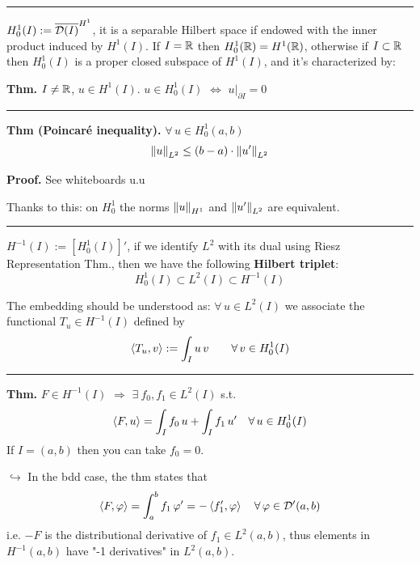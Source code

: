 \rule{0.31\textwidth}{0.2pt}
\smallskip

$H^1_0(I):=\overline{\mathcal{D}(I)}^{H^1}$, it is a separable Hilbert space if endowed with the inner product induced by $H^1(I)$. If $I=\mathbb{R}$ then $H^1_0(\mathbb{R})=H^1(\mathbb{R})$, otherwise if $I\subset\mathbb{R}$ then $H^1_0(I)$ is a proper closed subspace of $H^1(I)$, and it's characterized by:

\smallskip

\textbf{Thm.} $I\neq\mathbb{R}$, $u\in H^1(I)$. $u\in H^1_0(I)$ $\Leftrightarrow$ $u\big|_{\partial I}=0$

\rule{0.31\textwidth}{0.2pt}
\smallskip

\textbf{Thm (Poincaré inequality).} $\forall\, u\in H^1_0(a,b)$
\begin{equation*}
\left\lVert u \right\rVert_{L^2}\leq (b-a)\cdot \left\lVert u' \right\rVert_{L^2}
\end{equation*}

\textbf{\color{lavender(floral)}Proof.} See whiteboards u.u

\smallskip

Thanks to this: on $H^1_0$ the norms $\left\lVert u \right\rVert_{H^1}$ and $\left\lVert u' \right\rVert_{L^2}$ are equivalent.

\rule{0.31\textwidth}{0.2pt}
\smallskip

$H^{-1}(I):=\left[ H^1_0(I) \right]'$, if we identify $L^2$ with its dual using Riesz Representation Thm., then we have the following \textbf{Hilbert triplet}:
\begin{equation*}
H_0^1(I)\subset L^2(I) \subset H^{-1}(I)
\end{equation*}

The embedding should be understood as: $\forall\, u\in L^2(I)$ we associate the functional $T_u\in H^{-1}(I)$ defined by
\begin{equation*}
\left\langle T_u,v \right\rangle:=\int_I u\,v\qquad \forall\, v\in H^1_0(I)
\end{equation*}

\rule{0.31\textwidth}{0.2pt}
\smallskip

\textbf{Thm.} $F\in H^{-1}(I)$ $\Rightarrow$ $\exists\ f_0,f_1\in L^2(I)$ s.t.
\begin{equation*}
\left\langle F,u \right\rangle=\int_I f_0\,u+\int_I f_1\,u'\quad\forall\,u\in H^1_0(I)
\end{equation*}
If $I=(a,b)$ then you can take $f_0=0$.

\medskip

$\hookrightarrow$ In the bdd case, the thm  states that 
\begin{equation*}
\left\langle F,\varphi \right\rangle=\int_a^b f_1\,\varphi'=-\left\langle f_1',\varphi \right\rangle\quad \forall\, \varphi\in\mathcal{D}'(a,b)
\end{equation*}
i.e. $-F$ is the distributional derivative of $f_1\in L^2(a,b)$, thus elements in $H^{-1}(a,b)$ have "-1 derivatives" in $L^2(a,b)$.

